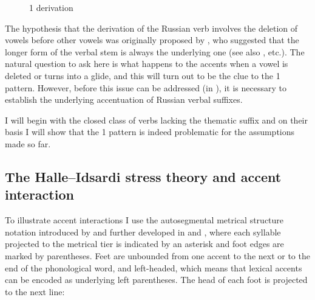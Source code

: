 \documentclass[output=paper,colorlinks,citecolor=black,koreanfont]{langscibook}
\begin{document}
\begin{figure}
    \caption{{1\SG} derivation}
    \label{mat:fig:derivation-stomp-1sg}
\end{figure}

The hypothesis that the derivation of the Russian verb involves the deletion of vowels before other vowels was originally proposed by \citet{Jakobson1948}, who suggested that the longer form of the verbal stem is always the underlying one (see also \citealt{Lightner1965,Halle1973,Melvold1989}, etc.). The natural question to ask here is what happens to the accents when a vowel is deleted or turns into a glide, and this will turn out to be the clue to the {1\SG} pattern. However, before this issue can be addressed (in ), it is necessary to establish the underlying accentuation of Russian verbal suffixes.

I will begin with the closed class of verbs lacking the thematic suffix  and on their basis I will show that the {1\SG} pattern is indeed problematic for the assumptions made so far.

\subsection{The Halle--Idsardi stress theory and accent interaction}\label{mat:subsec:HalleIdsardi}

To illustrate accent interactions I use the autosegmental metrical structure notation introduced by \citet{HalleVergnaud1987a,HalleVergnaud1987b} and further developed in \citet{Melvold1989,Idsardi1992,HalleIdsardi1995} and \citet{Halle1997}, where each syllable projected to the metrical tier is indicated by an asterisk and foot edges are marked by parentheses. Feet are unbounded from one accent to the next or to the end of the phonological word, and left-headed, which means that lexical accents can be encoded as underlying left parentheses. The head of each foot is projected to the next line:\bigskip
\end{document}
